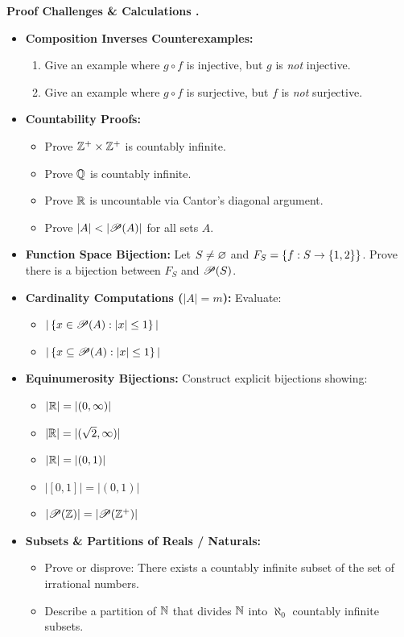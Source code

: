 \documentclass{natsirt}
\newcounter{topic}[section]
\newenvironment{challengebox}[1][]{%
    \begin{redbox}[#1]\refstepcounter{topic}\textbf{Proof Challenges \& Calculations \thesection.\thetopic}%
}{\end{redbox}}
\newcommand{\citem}{\item[$\square$]}
\begin{document}
\begin{challengebox}
    \begin{itemize}
        \citem \textbf{Composition Inverses Counterexamples:}
        \begin{enumerate}
            \item Give an example where $g \circ f$ is injective, but $g$ is \emph{not} injective.
            \item Give an example where $g \circ f$ is surjective, but $f$ is \emph{not} surjective.
        \end{enumerate}
        \citem \textbf{Countability Proofs:}
        \begin{itemize}
            \item Prove $\mathbb{Z}^+ \times \mathbb{Z}^+$ is countably infinite.
            \item Prove $\mathbb{Q}$ is countably infinite.
            \item Prove $\mathbb{R}$ is uncountable via Cantor's diagonal argument.
            \item Prove $|A| < |\mathscr{P}(A)|$ for all sets $A$.
        \end{itemize}
        \citem \textbf{Function Space Bijection:} Let $S \neq \varnothing$ and $F_S = \left\{ f : S \to \left\{ 1, 2 \right\} \right\}$. Prove there is a bijection between $F_S$ and $\mathscr{P}(S)$.
        \citem \textbf{Cardinality Computations ($|A| = m$):} Evaluate:
        \begin{itemize}
            \item $|\left\{ x \in \mathscr{P}(A) : |x| \le 1 \right\}|$
            \item $|\left\{ x \subseteq \mathscr{P}(A) : |x| \le 1 \right\}|$
        \end{itemize}
        \citem \textbf{Equinumerosity Bijections:} Construct explicit bijections showing:
        \begin{itemize}
            \item $|\mathbb{R}| = |(0, \infty)|$
            \item $|\mathbb{R}| = |(\sqrt{2}, \infty)|$
            \item $|\mathbb{R}| = |(0, 1)|$
            \item $|[0, 1]| = |(0, 1)|$
            \item $|\mathscr{P}(\mathbb{Z})| = |\mathscr{P}(\mathbb{Z}^+)|$
        \end{itemize}
        \citem \textbf{Subsets \& Partitions of Reals / Naturals:}
        \begin{itemize}
            \item Prove or disprove: There exists a countably infinite subset of the set of irrational numbers.
            \item Describe a partition of $\mathbb{N}$ that divides $\mathbb{N}$ into $\aleph_0$ countably infinite subsets.
        \end{itemize}
    \end{itemize}
\end{challengebox}
\end{document}
